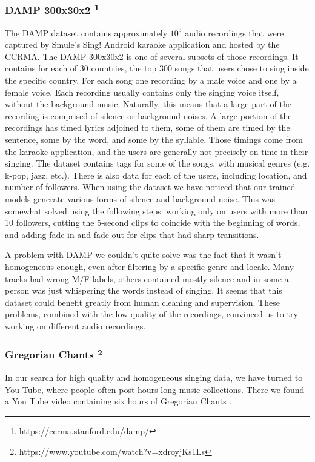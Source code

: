 \documentclass{article}
\begin{document}
\subsubsection*{DAMP 300x30x2 \footnote{https://ccrma.stanford.edu/damp/}}
The DAMP dataset contains approximately $10^5$ audio recordings that were captured by Smule's Sing! Android karaoke application and hosted by the CCRMA.
The DAMP 300x30x2 is one of several subsets of those recordings.
It contains for each of 30 countries, the top 300 songs that users chose to sing inside the specific country.
For each song one recording by a male voice and one by a female voice.
Each recording usually contains only the singing voice itself, without the background music.
Naturally, this means that a large part of the recording is comprised of silence or background noises.
A large portion of the recordings has timed lyrics adjoined to them, some of them are timed by the sentence, some by the word, and some by the syllable.
Those timings come from the karaoke application, and the users are generally not precisely on time in their singing.
The dataset contains tags for some of the songs, with musical genres (e.g. k-pop, jazz, etc.).
There is also data for each of the users, including location, and number of followers.
When using the dataset we have noticed that our trained models generate various forms of silence and background noise.
This was somewhat solved using the following steps: working only on users with more than 10 followers, cutting the 5-second clips to coincide with the beginning of words, and adding fade-in and fade-out for clips that had sharp transitions.

A problem with DAMP we couldn't quite solve was the fact that it wasn't homogeneous enough, even after filtering by a specific genre and locale.
Many tracks had wrong M/F labels, others contained mostly silence and in some a person was just whispering the words instead of singing. It seems that this dataset could benefit greatly from human cleaning and supervision.
These problems, combined with the low quality of the recordings, convinced us to try working on different audio recordings.

\subsubsection*{Gregorian Chants \footnote{https://www.youtube.com/watch?v=xdroyjKs1Ls}}

In our search for high quality and homogeneous singing data,
we have turned to You Tube, where people often post hours-long music collections.
There we found a You Tube video containing six hours of Gregorian Chants \cite{gregorianVideo}.
\end{document}
